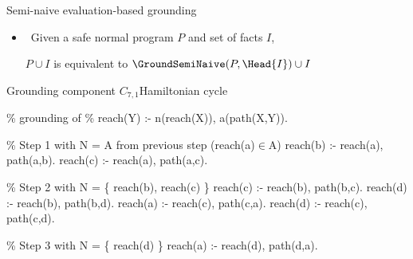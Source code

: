 \begin{frame}{Semi-naive evaluation-based grounding}
  \begin{center}
  \end{center}
  \smallskip
  \begin{itemize}
  \item<2->  \ Given a safe normal program \(P\) and set of facts \(I\),

    \(P \cup I\) is equivalent to \(\GroundSemiNaive(P,\Head{I}) \cup I\)
  \end{itemize}
\end{frame}
\begin{frame}{Grounding component \(C_{7,1}\)}{Hamiltonian cycle}
\begin{SemiVerbatim}[\small]{.9}
{\color{comment}\% grounding of
\% reach(Y) :- {n(reach(X))}, a(path(X,Y)).}

{\color{comment}\% Step 1 with N = A from previous step (reach(a)\({}\in{}\)A)}
\alert{reach(b)} :- \alert{reach(a)}\only<1>{)}, path(a,b).
\alert{reach(c)} :- \alert{reach(a)}, path(a,c).

{\color{comment}\% Step 2 with N = \{ reach(b), reach(c) \}}
reach(c) :- \alert{reach(b)}\only<1>{)}, path(b,c).
\alert{reach(d)} :- \alert{reach(b)}, path(b,d).
reach(a) :- \alert{reach(c)}, path(c,a).
\alert{reach(d)} :- \alert{reach(c)}, path(c,d).

{\color{comment}\% Step 3 with N = \{ reach(d) \}}
reach(a) :- \alert{reach(d)}\only<1>{)}, path(d,a).

\end{SemiVerbatim}
\end{frame}
